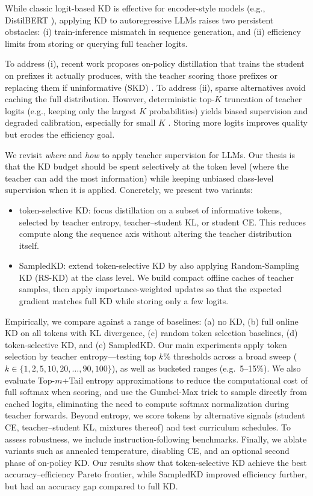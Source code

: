 \documentclass[11pt]{article}
\begin{document}
While classic logit-based KD is effective for encoder-style models (e.g., DistilBERT \citep{sanh2019distilbert}), applying KD to autoregressive LLMs raises two persistent obstacles: (i) train-inference mismatch in sequence generation, and (ii) efficiency limits from storing or querying full teacher logits.

To address (i), recent work proposes on-policy distillation that trains the student on prefixes it actually produces, with the teacher scoring those prefixes \citep{agarwal2024gkd} or replacing them if uninformative (SKD) \citep{xu2024speculative}.
To address (ii), sparse alternatives avoid caching the full distribution. However, deterministic top-$K$ truncation of teacher logits (e.g., keeping only the largest $K$ probabilities) yields biased supervision and degraded calibration, especially for small $K$ \citep{anshumann2025sparse,shum2024first}.
Storing more logits improves quality but erodes the efficiency goal.

We revisit \emph{where} and \emph{how} to apply teacher supervision for LLMs.
Our thesis is that the KD budget should be spent selectively at the token level (where the teacher can add the most information) while keeping unbiased class-level supervision when it is applied.
Concretely, we present two variants:
\begin{itemize}
	\item token-selective KD: focus distillation on a subset of informative tokens, selected by teacher entropy, teacher--student KL, or student CE. This reduces compute along the sequence axis without altering the teacher distribution itself.
	\item SampledKD: extend token-selective KD by also applying Random-Sampling KD (RS-KD) at the class level. We build compact offline caches of teacher samples, then apply importance-weighted updates so that the expected gradient matches full KD while storing only a few logits.
\end{itemize}

Empirically, we compare against a range of baselines: (a) no KD, (b) full online KD on all tokens with KL divergence, (c) random token selection baselines, (d) token-selective KD, and (e) SampledKD.
Our main experiments apply token selection by teacher entropy---testing top $k\%$ thresholds across a broad sweep ($k \in \{1,2,5,10,20,\ldots,90,100\}$), as well as bucketed ranges (e.g.\ 5--15\%).
We also evaluate Top-$m$+Tail entropy approximations to reduce the computational cost of full softmax when scoring, and use the Gumbel-Max trick to sample directly from cached logits, eliminating the need to compute softmax normalization during teacher forwards.
Beyond entropy, we score tokens by alternative signals (student CE, teacher--student KL, mixtures thereof) and test curriculum schedules.
To assess robustness, we include instruction-following benchmarks.
Finally, we ablate variants such as annealed temperature, disabling CE, and an optional second phase of on-policy KD.
Our results show that token-selective KD achieve the best accuracy--efficiency Pareto frontier, while SampledKD improved efficiency further, but had an accuracy gap compared to full KD.
\end{document}
